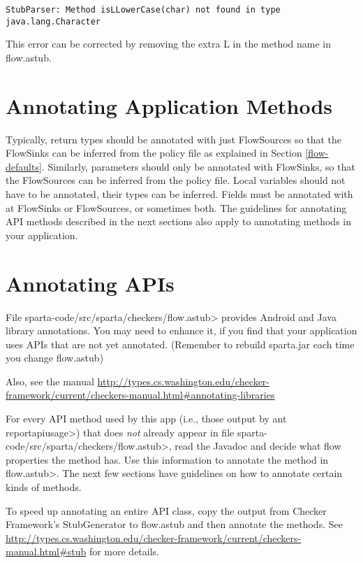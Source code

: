 \begin{Verbatim}
StubParser: Method isLLowerCase(char) not found in type java.lang.Character
\end{Verbatim}
This error can be corrected by removing the extra L in the method name in flow.astub.

\section{Annotating Application Methods\label{sec:annomethods}}

Typically, return types should be annotated with just FlowSources so that the FlowSinks can be inferred from the policy file as explained in Section \ref{flow-defaults}.
Similarly, parameters should only be annotated with FlowSinks, so that the FlowSources can be inferred from  the policy file.  Local variables should not have to be annotated, their types can be inferred. Fields must be annotated with at FlowSinks or FlowSources, or sometimes both. 
The guidelines for annotating API methods described in the next sections also apply to annotating methods in your application. 


\section{Annotating APIs\label{sec:annotatedAPI}}

File \<sparta-code/src/sparta/checkers/flow.astub> provides Android and Java
library annotations.  You may need to enhance it, if you find that your application
uses APIs that are not yet annotated.  (Remember to rebuild sparta.jar each time you change flow.astub)

Also, see the manual 
\url{http://types.cs.washington.edu/checker-framework/current/checkers-manual.html#annotating-libraries}

For every API method used by this app (i.e., those output by \<ant
reportapiusage>) that does \emph{not} already appear in file
\<sparta-code/src/sparta/checkers/flow.astub>, read the Javadoc and decide what flow properties the method
has.  Use this information to annotate the method in \<flow.astub>.  The next few sections have guidelines on
how to annotate certain kinds of methods. 

To speed up annotating an entire API class, copy the output from Checker Framework's StubGenerator to 
flow.astub and then annotate the methods.  See \url{http://types.cs.washington.edu/checker-framework/current/checkers-manual.html#stub} for more details. 

